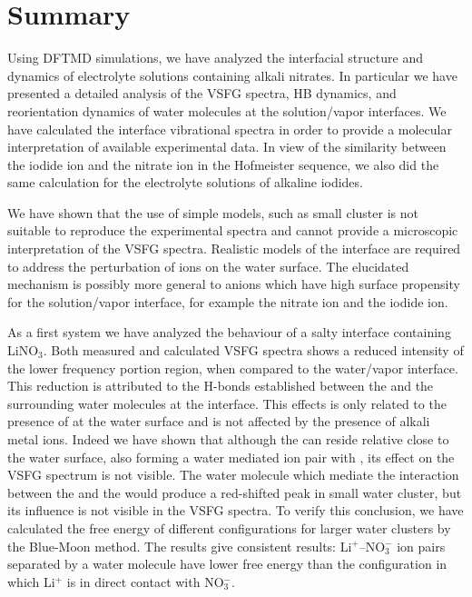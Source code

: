\chapter{Summary}\label{CHAPTER_Summary}
Using DFTMD simulations, we have analyzed the interfacial structure and dynamics of electrolyte solutions containing alkali nitrates.
In particular we have presented a detailed analysis of the VSFG spectra, HB dynamics, and reorientation dynamics of water molecules at the solution/vapor interfaces. 
We have calculated the interface vibrational spectra in order to provide a molecular interpretation of available experimental data. 
In view of the similarity between the iodide ion and the nitrate ion in the Hofmeister sequence, 
we also did the same calculation for the electrolyte solutions of alkaline iodides. 

We have shown that the use of simple models, such as small cluster is not suitable to reproduce the experimental spectra 
and cannot provide a microscopic interpretation of the VSFG spectra. Realistic models of the interface are required to address the 
perturbation of ions on the water surface. The elucidated mechanism is possibly more general to anions which have high 
surface propensity for the solution/vapor interface, for example the nitrate ion and the iodide ion.

As a first system we have analyzed the behaviour of a salty interface containing LiNO$_3$.
Both measured and calculated VSFG spectra shows a reduced intensity of the lower frequency portion region, 
when compared to the water/vapor interface. 
This reduction is attributed to the H-bonds established between the \nitrate and the surrounding water molecules at the interface.
This effects is only related to the presence of \nitrate at the water surface and is not affected by the presence of alkali metal ions.
Indeed we have shown that although the \Li can reside relative close to the water surface, also forming a water mediated
ion pair with \nit, its effect on the VSFG spectrum is not visible. The water molecule which mediate the interaction 
between the \nitrate and the \Li would produce a red-shifted peak in small water cluster, but its influence is not visible 
in the VSFG spectra. To verify this conclusion, we have calculated the free energy of different configurations for 
larger water clusters by the Blue-Moon method. The results give consistent results: Li$^+$--NO$_3^-$ ion pairs 
separated by a water molecule have lower free energy than the configuration in which Li$^+$ is in direct contact with NO$_3^-$. 

